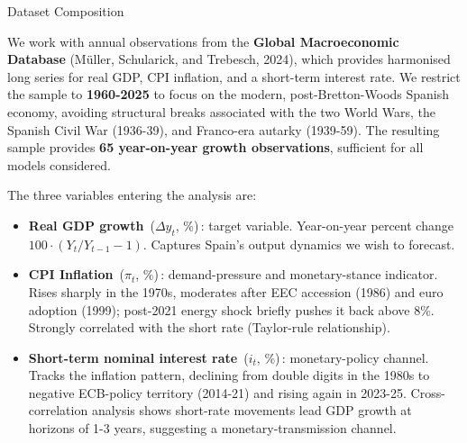 \documentclass[9pt]{beamer}
\begin{document}
\begin{frame}{Dataset Composition}
\footnotesize

We work with annual observations from the \textbf{Global Macroeconomic Database} (Müller, Schularick, and Trebesch, 2024), which provides harmonised long series for real GDP, CPI inflation, and a short-term interest rate. We restrict the sample to \textbf{1960-2025} to focus on the modern, post-Bretton-Woods Spanish economy, avoiding structural breaks associated with the two World Wars, the Spanish Civil War (1936-39), and Franco-era autarky (1939-59). The resulting sample provides \textbf{65 year-on-year growth observations}, sufficient for all models considered.

\vspace{0.25cm}

The three variables entering the analysis are:
\begin{itemize}
  \item \textbf{Real GDP growth} \,($\Delta y_t$, \%)\,: target variable. Year-on-year percent change $100 \cdot (Y_t/Y_{t-1}-1)$. Captures Spain's output dynamics we wish to forecast.

  \item \textbf{CPI Inflation} \,($\pi_t$, \%)\,: demand-pressure and monetary-stance indicator. Rises sharply in the 1970s, moderates after EEC accession (1986) and euro adoption (1999); post-2021 energy shock briefly pushes it back above 8\%. Strongly correlated with the short rate (Taylor-rule relationship).

  \item \textbf{Short-term nominal interest rate} \,($i_t$, \%)\,: monetary-policy channel. Tracks the inflation pattern, declining from double digits in the 1980s to negative ECB-policy territory (2014-21) and rising again in 2023-25. Cross-correlation analysis shows short-rate movements lead GDP growth at horizons of 1-3 years, suggesting a monetary-transmission channel.
\end{itemize}

\end{frame}
\end{document}
